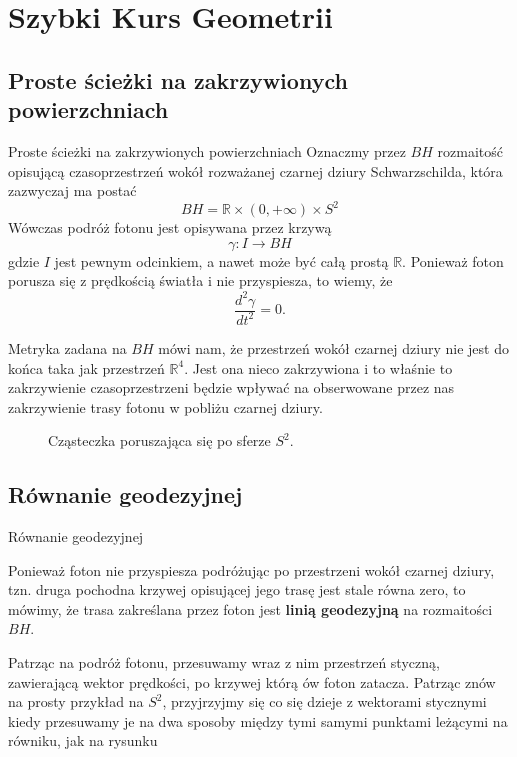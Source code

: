 \documentclass[polish, 9pt, xcolor=table, hyperref={pdfpagemode=FullScreen}]{beamer}
\newcommand{\R}{\mathbb{R}}
\begin{document}
\section{Szybki Kurs Geometrii}

\subsection{Proste ścieżki na zakrzywionych powierzchniach}

\begin{frame}{Proste ścieżki na zakrzywionych powierzchniach}
Oznaczmy przez $BH$ rozmaitość opisującą czasoprzestrzeń wokół rozważanej czarnej dziury Schwarzschilda, która zazwyczaj ma postać
$$ BH = \R \times (0,+\infty) \times S^2 $$
Wówczas podróż fotonu jest opisywana przez krzywą
$$ \gamma:I \to BH $$
gdzie $I$ jest pewnym odcinkiem, a nawet może być całą prostą $\R$. Ponieważ foton porusza się z prędkością światła i nie przyspiesza, to wiemy, że
$$\frac{d^2 \gamma} {d t^2}=0.$$ 
\end{frame}

\begin{frame}
Metryka zadana na $BH$ mówi nam, że przestrzeń wokół czarnej dziury nie jest do końca taka jak przestrzeń $\R^4$. Jest ona nieco zakrzywiona i to właśnie to zakrzywienie czasoprzestrzeni będzie wpływać na obserwowane przez nas zakrzywienie trasy fotonu w pobliżu czarnej dziury.
\renewcommand{\figurename}{Rysunek}
\begin{figure}[h] 
  \centering 
  \vspace{1cm}
  \caption{Cząsteczka poruszająca się po sferze $S^2$.}\label{czasteczka po sferze}
  \vspace{1cm}
\end{figure}
\end{frame}

\subsection{Równanie geodezyjnej}

\begin{frame}{Równanie geodezyjnej}

Ponieważ foton nie przyspiesza podróżując po przestrzeni wokół czarnej dziury, tzn. druga pochodna krzywej opisującej jego trasę jest stale równa zero, to mówimy, że trasa zakreślana przez foton jest \textbf{linią geodezyjną} na rozmaitości $BH$.

Patrząc na podróż fotonu, przesuwamy wraz z nim przestrzeń styczną, zawierającą wektor prędkości, po krzywej którą ów foton zatacza. Patrząc znów na prosty przykład na $S^2$, przyjrzyjmy się co się dzieje z wektorami stycznymi kiedy przesuwamy je na dwa sposoby między tymi samymi punktami leżącymi na równiku, jak na rysunku

\end{frame}
\end{document}
